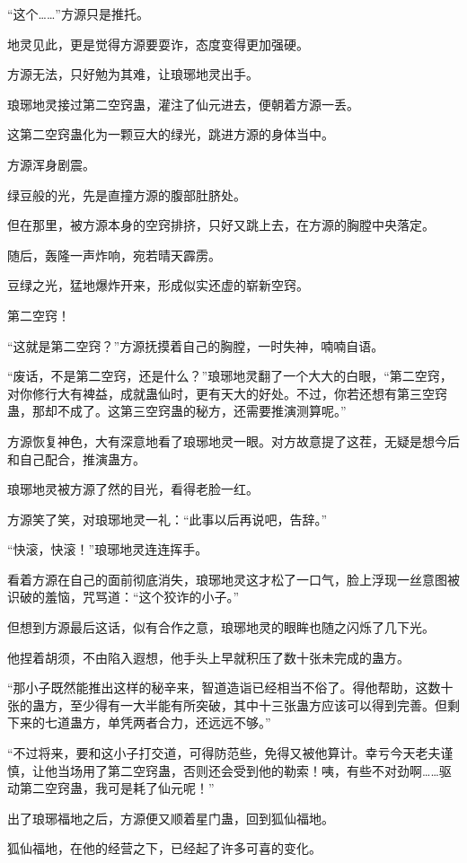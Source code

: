 \begin{this_body}
“这个……”方源只是推托。

地灵见此，更是觉得方源要耍诈，态度变得更加强硬。

方源无法，只好勉为其难，让琅琊地灵出手。

琅琊地灵接过第二空窍蛊，灌注了仙元进去，便朝着方源一丢。

这第二空窍蛊化为一颗豆大的绿光，跳进方源的身体当中。

方源浑身剧震。

绿豆般的光，先是直撞方源的腹部肚脐处。

但在那里，被方源本身的空窍排挤，只好又跳上去，在方源的胸膛中央落定。

随后，轰隆一声炸响，宛若晴天霹雳。

豆绿之光，猛地爆炸开来，形成似实还虚的崭新空窍。

第二空窍！

“这就是第二空窍？”方源抚摸着自己的胸膛，一时失神，喃喃自语。

“废话，不是第二空窍，还是什么？”琅琊地灵翻了一个大大的白眼，“第二空窍，对你修行大有裨益，成就蛊仙时，更有天大的好处。不过，你若还想有第三空窍蛊，那却不成了。这第三空窍蛊的秘方，还需要推演测算呢。”

方源恢复神色，大有深意地看了琅琊地灵一眼。对方故意提了这茬，无疑是想今后和自己配合，推演蛊方。

琅琊地灵被方源了然的目光，看得老脸一红。

方源笑了笑，对琅琊地灵一礼：“此事以后再说吧，告辞。”

“快滚，快滚！”琅琊地灵连连挥手。

看着方源在自己的面前彻底消失，琅琊地灵这才松了一口气，脸上浮现一丝意图被识破的羞恼，咒骂道：“这个狡诈的小子。”

但想到方源最后这话，似有合作之意，琅琊地灵的眼眸也随之闪烁了几下光。

他捏着胡须，不由陷入遐想，他手头上早就积压了数十张未完成的蛊方。

“那小子既然能推出这样的秘辛来，智道造诣已经相当不俗了。得他帮助，这数十张的蛊方，至少得有一大半能有所突破，其中十三张蛊方应该可以得到完善。但剩下来的七道蛊方，单凭两者合力，还远远不够。”

“不过将来，要和这小子打交道，可得防范些，免得又被他算计。幸亏今天老夫谨慎，让他当场用了第二空窍蛊，否则还会受到他的勒索！咦，有些不对劲啊……驱动第二空窍蛊，我可是耗了仙元呢！”

出了琅琊福地之后，方源便又顺着星门蛊，回到狐仙福地。

狐仙福地，在他的经营之下，已经起了许多可喜的变化。


\end{this_body}
